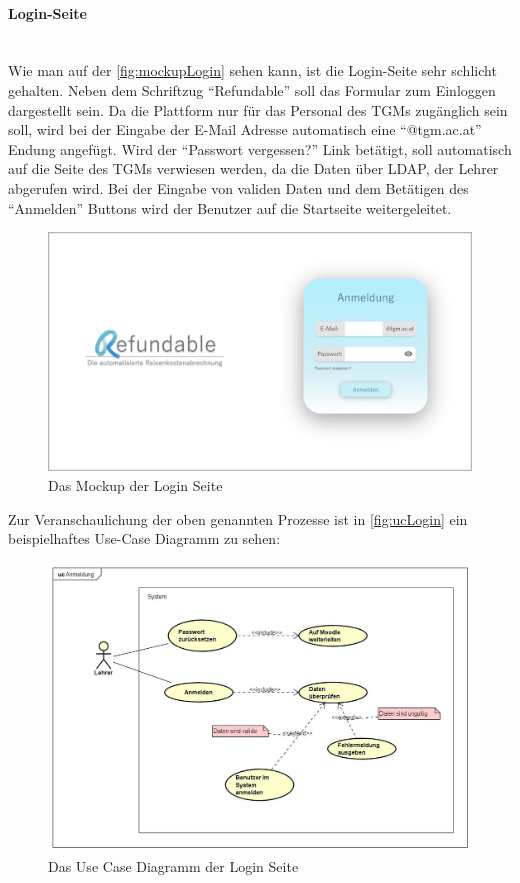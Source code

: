 \paragraph{Login-Seite}
~\\
Wie man auf der \autoref{fig:mockupLogin} sehen kann, ist die Login-Seite sehr schlicht gehalten. Neben dem Schriftzug \enquote{Refundable} soll das Formular zum Einloggen dargestellt sein. Da die Plattform nur für das Personal des TGMs zugänglich sein soll, wird bei der Eingabe der E-Mail Adresse automatisch eine \enquote{@tgm.ac.at} Endung angefügt. Wird der \enquote{Passwort vergessen?} Link betätigt, soll automatisch auf die Seite des TGMs verwiesen werden, da die Daten über LDAP, der Lehrer abgerufen wird. Bei der Eingabe von validen Daten und dem Betätigen des \enquote{Anmelden} Buttons wird der Benutzer auf die Startseite weitergeleitet.
\begin{figure}[H]
	\centering
	\includegraphics[width=1\linewidth]{images/Mockup-Startseite}
	\caption[Mockup Login]{Das Mockup der Login Seite}
	\label{fig:mockupLogin}
\end{figure}
Zur Veranschaulichung der oben genannten Prozesse ist in \autoref{fig:ucLogin} ein beispielhaftes Use-Case Diagramm zu sehen: 
\begin{figure}[H]
	\centering
	\includegraphics[width=1\linewidth]{images/uc-login}
	\caption[Use Case Diagramm Login]{Das Use Case Diagramm der Login Seite}
	\label{fig:ucLogin}
\end{figure}
\newpage
